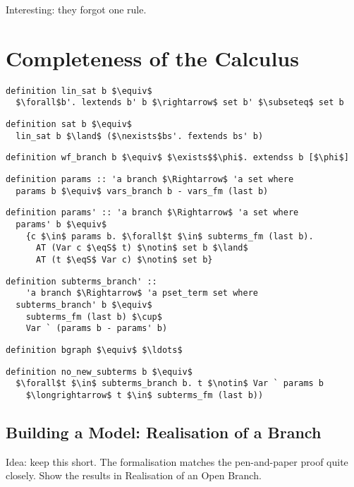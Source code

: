 \documentclass[sigplan,10pt,anonymous,review]{acmart}
\newcommand{\eqS}{\approx_\text{s}}
\begin{document}
Interesting: they forgot one rule.

\section{Completeness of the Calculus}
\begin{lstlisting}
definition lin_sat b $\equiv$
  $\forall$b'. lextends b' b $\rightarrow$ set b' $\subseteq$ set b
\end{lstlisting}

\begin{lstlisting}
definition sat b $\equiv$
  lin_sat b $\land$ ($\nexists$bs'. fextends bs' b)
\end{lstlisting}

\begin{lstlisting}
definition wf_branch b $\equiv$ $\exists$$\phi$. extendss b [$\phi$]
\end{lstlisting}

\begin{lstlisting}
definition params :: 'a branch $\Rightarrow$ 'a set where
  params b $\equiv$ vars_branch b - vars_fm (last b)
\end{lstlisting}

\begin{lstlisting}
definition params' :: 'a branch $\Rightarrow$ 'a set where
  params' b $\equiv$
    {c $\in$ params b. $\forall$t $\in$ subterms_fm (last b).
      AT (Var c $\eqS$ t) $\notin$ set b $\land$
      AT (t $\eqS$ Var c) $\notin$ set b} 
\end{lstlisting}

\begin{lstlisting}
definition subterms_branch' ::
    'a branch $\Rightarrow$ 'a pset_term set where
  subterms_branch' b $\equiv$
    subterms_fm (last b) $\cup$ 
    Var ` (params b - params' b)
\end{lstlisting}

\begin{lstlisting}
definition bgraph $\equiv$ $\ldots$ 
\end{lstlisting}

\begin{lstlisting}
definition no_new_subterms b $\equiv$
  $\forall$t $\in$ subterms_branch b. t $\notin$ Var ` params b
    $\longrightarrow$ t $\in$ subterms_fm (last b))
\end{lstlisting}

\subsection{Building a Model: Realisation of a Branch}
Idea: keep this short. The formalisation matches the pen-and-paper proof quite closely.
Show the results in Realisation of an Open Branch.
\end{document}
